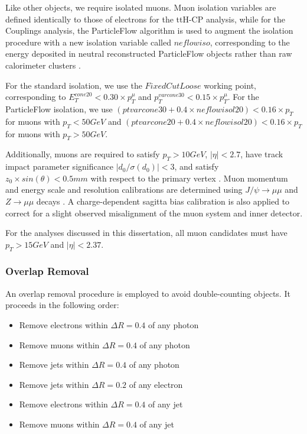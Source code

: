 Like other objects, we require isolated muons. Muon isolation variables are defined identically to those of electrons for the ttH-CP analysis, while for the Couplings analysis, the ParticleFlow algorithm is used to augment the isolation procedure with a new isolation variable called $neflowiso$, corresponding to the energy deposited in neutral reconstructed ParticleFlow objects rather than raw calorimeter clusters \cite{ATL-COM-PHYS-2019-177}. 

For the standard isolation, we use the $FixedCutLoose$ working point, corresponding to $E_{T}^{cone20}<0.30 \times p_{T}^{\mu}$ and $p_{T}^{varcone30}<0.15 \times p_{T}^{\mu}$. For the ParticleFlow isolation, we use $(ptvarcone30+ 0.4\times neflowisol20) <0.16 \times p_{T}$ for muons with $p_{T} < 50GeV$ and $(ptvarcone20+ 0.4\times neflowisol20) < 0.16 \times p_{T}$ for muons with $p_{T} > 50GeV$.

Additionally, muons are required to satisfy $p_{T} > 10 GeV$, $|\eta| < 2.7$, have track impact parameter significance $|d_{0} / \sigma(d_{0})| < 3$, and satisfy $z_{0} \times sin(\theta) < 0.5 mm$ with respect to the primary vertex \cite{ATL-COM-PHYS-2020-378}. Muon momentum and energy scale and resolution calibrations are determined using $J/\psi \rightarrow \mu \mu$ and $Z \rightarrow \mu \mu$ decays \cite{CERN-EP-2016-033}. A charge-dependent sagitta bias calibration is also applied to correct for a slight observed misalignment of the muon system and inner detector.

For the analyses discussed in this dissertation, all muon candidates must have $p_{T} > 15 GeV$ and $|\eta| < 2.37$.
 
\subsubsection{Overlap Removal} \label{sec:Overlap}

An overlap removal procedure is employed to avoid double-counting objects. It proceeds in the following order:

\begin{itemize}
\item Remove electrons within $\Delta R=0.4$ of any photon
\item Remove muons within $\Delta R=0.4$ of any photon
\item Remove jets within $\Delta R=0.4$ of any photon
\item Remove jets within $\Delta R=0.2$ of any electron
\item Remove electrons within $\Delta R=0.4$ of any jet
\item Remove muons within $\Delta R=0.4$ of any jet
\end{itemize}

